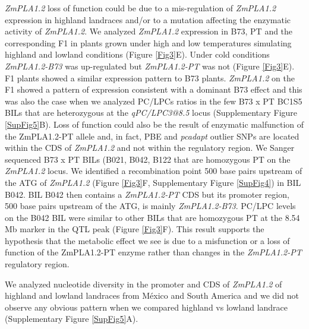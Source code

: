 \documentclass[9pt,twocolumn,twoside,lineno]{BioRxiv}
\begin{document}
\textit{ZmPLA1.2} loss of function could be due to a mis-regulation of \textit{ZmPLA1.2} expression in highland landraces and/or to a mutation affecting the enzymatic activity of \textit{ZmPLA1.2}. 
We analyzed \textit{ZmPLA1.2} expression in B73, PT and the corresponding F1 in plants grown under high and low temperatures simulating highland and lowland conditions (Figure \ref{Fig3}E). 
Under cold conditions \textit{ZmPLA1.2-B73} was up-regulated but \textit{ZmPLA1.2-PT} was not (Figure \ref{Fig3}E). 
F1 plants showed a similar expression pattern to B73 plants.
\textit{ZmPLA1.2} on the F1 showed a pattern of expression consistent with a dominant B73 effect and this was also the case when we analyzed PC/LPCs ratios in the few B73 x PT BC1S5 BILs that are heterozygous at the \textit{qPC/LPC3@8.5} locus (Supplementary Figure \ref{SupFig5}B).
Loss of function could also be the result of enzymatic malfunction of the ZmPLA1.2-PT allele and, in fact, PBE and \textit{pcadapt} outlier SNPs are located within the CDS of \textit{ZmPLA1.2} and not within the regulatory region. 
We Sanger sequenced B73 x PT BILs (B021, B042, B122 that are homozygous PT on the \textit{ZmPLA1.2} locus.
We identified a recombination point 500 base pairs upstream of the ATG of \textit{ZmPLA1.2} (Figure \ref{Fig3}F, Supplementary Figure \ref{SupFig4}) in BIL B042.
BIL B042 then contains a \textit{ZmPLA1.2-PT} CDS but its promoter region, 500 base pairs upstream of the ATG, is mainly \textit{ZmPLA1.2-B73}.  
PC/LPC levels on the B042 BIL were similar to other BILs that are homozygous PT at the 8.54 Mb marker in the QTL peak (Figure \ref{Fig3}F). 
This result supports the hypothesis that the metabolic effect we see is due to a misfunction or a loss of function of the ZmPLA1.2-PT enzyme rather than changes in the \textit{ZmPLA1.2-PT} regulatory region. 

We analyzed nucleotide diversity in the promoter and CDS of \textit{ZmPLA1.2} of highland and lowland landraces from México and South America and we did not observe any obvious pattern  when we compared highland vs lowland landrace (Supplementary Figure \ref{SupFig5}A).
\end{document}
